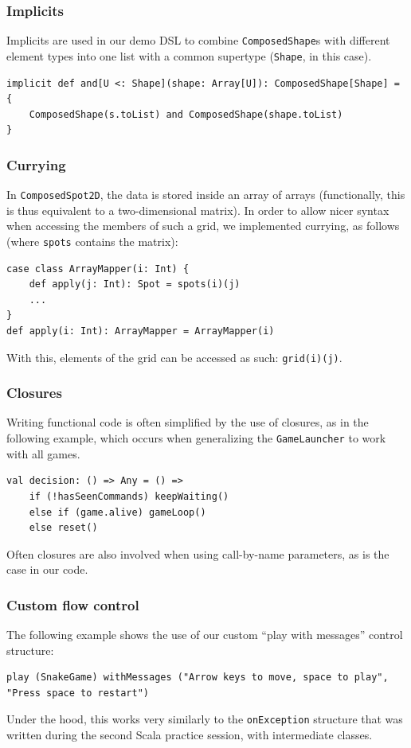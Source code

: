 \documentclass[journal,onecolumn, 9pt]{IEEEtran}
\theoremstyle{definition}
\newcommand{\scala}[1]{\texttt{#1}}
\begin{document}
\subsubsection{Implicits}
Implicits are used in our demo DSL to combine \scala{ComposedShape}s with different element types into one list with a common supertype (\scala{Shape}, in this case).
\begin{verbatim}
implicit def and[U <: Shape](shape: Array[U]): ComposedShape[Shape] = {
	ComposedShape(s.toList) and ComposedShape(shape.toList)
}
\end{verbatim}

\subsubsection{Currying}
In \scala{ComposedSpot2D}, the data is stored inside an array of arrays (functionally, this is thus equivalent to a two-dimensional matrix).
In order to allow nicer syntax when accessing the members of such a grid, we implemented currying, as follows (where \scala{spots} contains the matrix):
\begin{verbatim}
case class ArrayMapper(i: Int) {
	def apply(j: Int): Spot = spots(i)(j)
	...
}
def apply(i: Int): ArrayMapper = ArrayMapper(i)
\end{verbatim}
With this, elements of the grid can be accessed as such: \scala{grid(i)(j)}.

\subsubsection{Closures}
Writing functional code is often simplified by the use of closures, as in the following example, which occurs when generalizing the \scala{GameLauncher} to work with all games.
\begin{verbatim}
val decision: () => Any = () =>
	if (!hasSeenCommands) keepWaiting()
	else if (game.alive) gameLoop()
	else reset()
\end{verbatim}
Often closures are also involved when using call-by-name parameters, as is the case in our code.

\subsubsection{Custom flow control}
The following example shows the use of our custom ``play with messages'' control structure:
\begin{verbatim}
play (SnakeGame) withMessages ("Arrow keys to move, space to play", "Press space to restart")
\end{verbatim}
Under the hood, this works very similarly to the \scala{onException} structure that was written during the second Scala practice session, with intermediate classes.
\end{document}
